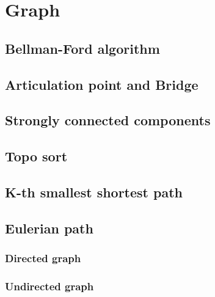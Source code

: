 \section{Graph}

\subsection{Bellman-Ford algorithm}

\subsection{Articulation point and Bridge}

\subsection{Strongly connected components}

\subsection{Topo sort}

\subsection{K-th smallest shortest path}

\subsection{Eulerian path}
	\subsubsection{Directed graph}

	\subsubsection{Undirected graph}
